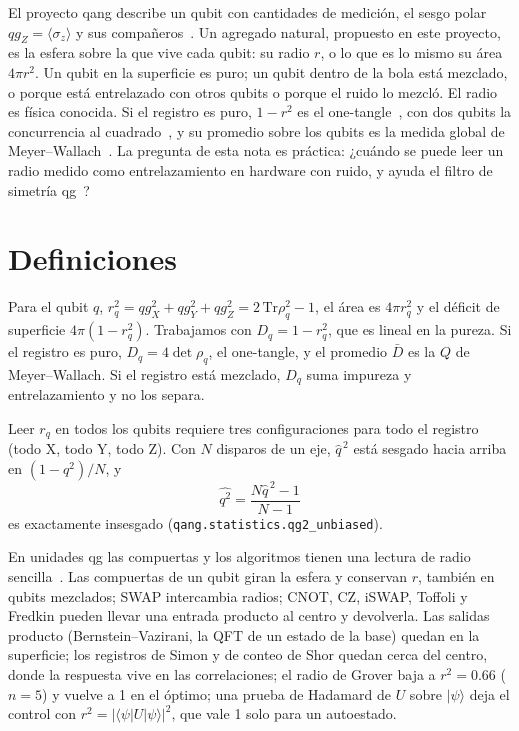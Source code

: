 \documentclass[11pt]{article}
\newcommand{\qZ}{qg_Z}
\newcommand{\qX}{qg_X}
\newcommand{\qY}{qg_Y}
\begin{document}
El proyecto qang describe un qubit con cantidades de medición, el sesgo polar $\qZ=\langle\sigma_z\rangle$ y sus
compañeros~\cite{monteverde2026qang}. Un agregado natural, propuesto en este proyecto, es la esfera sobre la que vive
cada qubit: su radio $r$, o lo que es lo mismo su área $4\pi r^2$. Un qubit en la superficie es puro; un qubit dentro de
la bola está mezclado, o porque está entrelazado con otros qubits o porque el ruido lo mezcló. El radio es física
conocida. Si el registro es puro, $1-r^2$ es el one-tangle~\cite{coffman2000}, con dos qubits la concurrencia al
cuadrado~\cite{wootters1998}, y su promedio sobre los qubits es la medida global de
Meyer--Wallach~\cite{meyer2002,brennen2003}. La pregunta de esta nota es práctica: ¿cuándo se puede leer un radio medido
como entrelazamiento en hardware con ruido, y ayuda el filtro de simetría qg~\cite{monteverde2026witness}?

\section{Definiciones}

Para el qubit $q$, $r_q^2=\qX^2+\qY^2+\qZ^2=2\,\mathrm{Tr}\rho_q^2-1$, el área es $4\pi r_q^2$ y el déficit de
superficie $4\pi(1-r_q^2)$. Trabajamos con $D_q=1-r_q^2$, que es lineal en la pureza. Si el registro es puro,
$D_q=4\det\rho_q$, el one-tangle, y el promedio $\bar D$ es la $Q$ de Meyer--Wallach. Si el registro está mezclado,
$D_q$ suma impureza y entrelazamiento y no los separa.

Leer $r_q$ en todos los qubits requiere tres configuraciones para todo el registro (todo X, todo Y, todo Z). Con $N$
disparos de un eje, $\hat q^{\,2}$ está sesgado hacia arriba en $(1-q^2)/N$, y
\begin{equation}\label{eq:insesgado}
\widehat{q^2}=\frac{N\hat q^{\,2}-1}{N-1}
\end{equation}
es exactamente insesgado (\texttt{qang.statistics.qg2\_unbiased}).

En unidades qg las compuertas y los algoritmos tienen una lectura de radio sencilla~\cite{monteverde2026formulation}.
Las compuertas de un qubit giran la esfera y conservan $r$, también en qubits mezclados; SWAP intercambia radios; CNOT,
CZ, iSWAP, Toffoli y Fredkin pueden llevar una entrada producto al centro y devolverla. Las salidas producto
(Bernstein--Vazirani, la QFT de un estado de la base) quedan en la superficie; los registros de Simon y de conteo de Shor
quedan cerca del centro, donde la respuesta vive en las correlaciones; el radio de Grover baja a $r^2=0.66$ ($n=5$) y
vuelve a 1 en el óptimo; una prueba de Hadamard de $U$ sobre $|\psi\rangle$ deja el control con
$r^2=|\langle\psi|U|\psi\rangle|^2$, que vale 1 solo para un autoestado.
\end{document}
